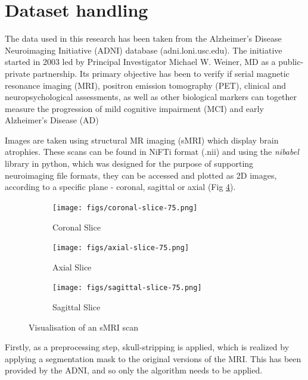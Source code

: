 \documentclass[a4paper, 12pt]{article}
\begin{document}
\newpage
\section{Dataset handling}
The data used in this research has been taken from the Alzheimer's Disease Neuroimaging Initiative (ADNI)
database (adni.loni.usc.edu). The initiative started in 2003 led by Principal Investigator Michael W. Weiner, MD
as a public-private partnership. Its primary objective has been to verify if serial magnetic resonance imaging (MRI),
positron emission tomography (PET), clinical and neuropsychological assessments, as well as other biological markers
can together measure the progression of mild cognitive impairment (MCI) and early Alzheimer's Disease (AD)\\
\cite{PMID20042704}

Images are taken using structural MR imaging (sMRI) which display brain atrophies. These scans can be found in
NiFTi format (.nii) and using the \textit{nibabel} library in python, which was designed for the purpose of
supporting neuroimaging file formats, they can be accessed and plotted as 2D images, according to a specific
plane - coronal, sagittal or axial (Fig \ref{fig:images}).

\begin{figure}[htbp]
    \centering
    \begin{subfigure}[b]{0.3\textwidth}
        \centering
        \texttt{[image: figs/coronal-slice-75.png]}
        \caption{Coronal Slice}
        \label{fig:sub1}
    \end{subfigure}
    \begin{subfigure}[b]{0.3\textwidth}
        \centering
        \texttt{[image: figs/axial-slice-75.png]}
        \caption{Axial Slice}
        \label{fig:sub2}
    \end{subfigure}
    \begin{subfigure}[b]{0.3\textwidth}
        \centering
        \texttt{[image: figs/sagittal-slice-75.png]}
        \caption{Sagittal Slice}
        \label{fig:sub3}
    \end{subfigure}
    \caption{Visualisation of an sMRI scan}
    \label{fig:images}
\end{figure}

Firstly, as a preprocessing step, skull-stripping is applied, which is realized by applying a segmentation mask
to the original versions of the MRI. This has been provided by the ADNI, and so only the algorithm
needs to be applied.
\end{document}
